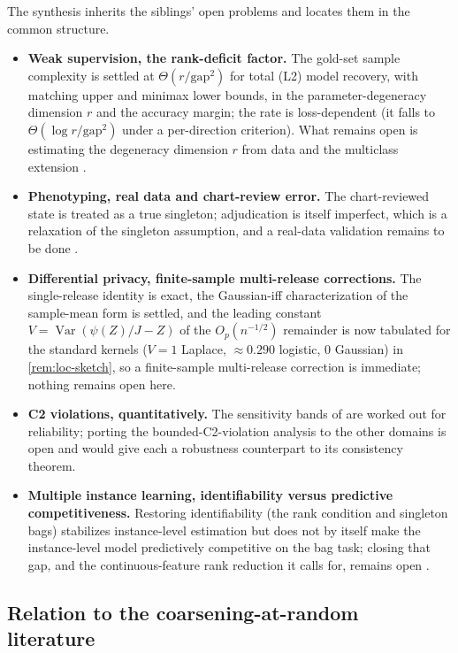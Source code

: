 The synthesis inherits the siblings' open problems and locates them in
the common structure.
\begin{itemize}
\item \textbf{Weak supervision, the rank-deficit factor.} The gold-set
  sample complexity is settled at $\Theta(r/\mathrm{gap}^2)$ for total
  (L2) model recovery, with matching upper and minimax lower bounds, in
  the parameter-degeneracy dimension $r$ and the accuracy margin; the
  rate is loss-dependent (it falls to $\Theta(\log r/\mathrm{gap}^2)$
  under a per-direction criterion). What remains open is estimating the
  degeneracy dimension $r$ from data and the multiclass extension
  \citep{towell2026weaksupcoarsening}.
\item \textbf{Phenotyping, real data and chart-review error.} The
  chart-reviewed state is treated as a true singleton; adjudication is
  itself imperfect, which is a relaxation of the singleton assumption,
  and a real-data validation remains to be done
  \citep{towell2026phenotypecoarsening}.
\item \textbf{Differential privacy, finite-sample multi-release
  corrections.} The single-release identity is exact, the Gaussian-iff
  characterization of the sample-mean form is settled, and the leading
  constant $V = \operatorname{Var}(\psi(Z)/J - Z)$ of the $O_p(n^{-1/2})$
  remainder is now tabulated for the standard kernels ($V = 1$ Laplace,
  $\approx 0.290$ logistic, $0$ Gaussian) in \cref{rem:loc-sketch}, so a
  finite-sample multi-release correction is immediate; nothing remains open
  here.
\item \textbf{C2 violations, quantitatively.} The sensitivity bands of
  \citet{towell2026mdrelax} are worked out for reliability; porting the
  bounded-C2-violation analysis to the other domains is open and would
  give each a robustness counterpart to its consistency theorem.
\item \textbf{Multiple instance learning, identifiability versus
  predictive competitiveness.} Restoring identifiability (the rank
  condition and singleton bags) stabilizes instance-level estimation but
  does not by itself make the instance-level model predictively
  competitive on the bag task; closing that gap, and the
  continuous-feature rank reduction it calls for, remains open
  \citep{towell2026milcoarsening}.
\end{itemize}

\subsection{Relation to the coarsening-at-random literature}

